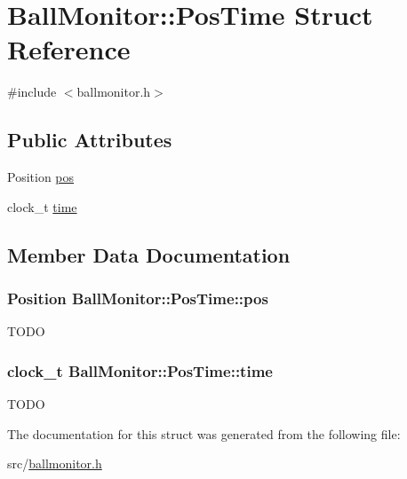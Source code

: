 \hypertarget{structBallMonitor_1_1PosTime}{
\section{BallMonitor::PosTime Struct Reference}
\label{structBallMonitor_1_1PosTime}
}


{\ttfamily \#include $<$ballmonitor.h$>$}

\subsection*{Public Attributes}
\begin{DoxyCompactItemize}
\item 
Position \hyperlink{structBallMonitor_1_1PosTime_ae049de4ada401c92ec560198e5947e59}{pos}
\item 
clock\_\-t \hyperlink{structBallMonitor_1_1PosTime_ae56e28b26f0d91d164d5bfe0b0644cb2}{time}
\end{DoxyCompactItemize}


\subsection{Member Data Documentation}
\hypertarget{structBallMonitor_1_1PosTime_ae049de4ada401c92ec560198e5947e59}{
\subsubsection[{pos}]{\setlength{\rightskip}{0pt plus 5cm}Position {\bf BallMonitor::PosTime::pos}}}
\label{structBallMonitor_1_1PosTime_ae049de4ada401c92ec560198e5947e59}
TODO \hypertarget{structBallMonitor_1_1PosTime_ae56e28b26f0d91d164d5bfe0b0644cb2}{
\subsubsection[{time}]{\setlength{\rightskip}{0pt plus 5cm}clock\_\-t {\bf BallMonitor::PosTime::time}}}
\label{structBallMonitor_1_1PosTime_ae56e28b26f0d91d164d5bfe0b0644cb2}
TODO 

The documentation for this struct was generated from the following file:\begin{DoxyCompactItemize}
\item 
src/\hyperlink{ballmonitor_8h}{ballmonitor.h}\end{DoxyCompactItemize}
